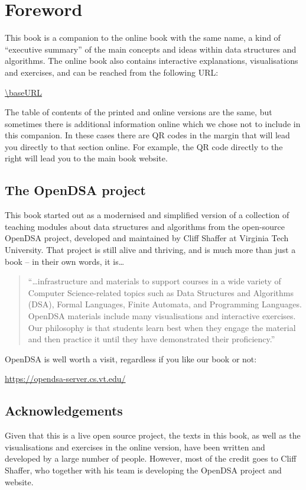 \section*{Foreword}

This book is a companion to the online book with the same name, a kind of ``executive summary'' of the main concepts and ideas within data structures and algorithms.
The online book also contains interactive explanations, visualisations and exercises, and can be reached from the following URL:
\begin{center}
  \url{\baseURL}
\end{center}
The table of contents of the printed and online versions are the same, but sometimes there is additional information online which we chose not to include in this companion.
In these cases there are QR codes in the margin that will lead you directly to that section online.
For example, the QR code directly to the right will lead you to the main book website.


\subsection*{The OpenDSA project}

This book started out as a modernised and simplified version of a collection of teaching modules about data structures and algorithms from the open-source OpenDSA project, developed and maintained by Cliff Shaffer at Virginia Tech University.
That project is still alive and thriving, and is much more than just a book -- in their own words, it is\ldots

\begin{quotation}
  ``\ldots infrastructure and materials to support courses in a wide variety of Computer Science-related topics such as Data Structures and Algorithms (DSA), Formal Languages, Finite Automata, and Programming Languages.
  OpenDSA materials include many visualisations and interactive exercises. Our philosophy is that students learn best when they engage the material and then practice it until they have demonstrated their proficiency.''
\end{quotation}

OpenDSA is well worth a visit, regardless if you like our book or not:
\begin{center}
  \url{https://opendsa-server.cs.vt.edu/}
\end{center}

\subsection*{Acknowledgements}

Given that this is a live open source project, the texts in this book, as well as the visualisations and exercises in the online version, have been written and developed by a large number of people.
However, most of the credit goes to Cliff Shaffer, who together with his team is developing the OpenDSA project and website.

\newpage
